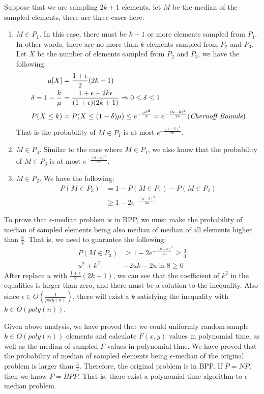 \documentclass[paper=a4, fontsize=11pt]{scrartcl} %
\numberwithin{equation}{section} %
\numberwithin{figure}{section} %
\numberwithin{table}{section} %
\begin{document}
Suppose that we are sampling $2k+1$ elements, let $M$ be the median of the sampled elements, there
are three cases here:
\begin{enumerate}
  \item $M \in P_1$. In this case, there must be $k+1$ or more elements sampled from $P_1$. In other
    words, there are no more than $k$ elements sampled from $P_2$ and $P_3$. Let $X$ be the number of
    elements sampled from $P_2$ and $P_3$, we have the following:
    \begin{align}
      \mu[X] & = \frac{1 + \epsilon}{2} (2k+1) \\
      \delta = 1 - \frac{k}{\mu} &= \frac{1 + \epsilon + 2k\epsilon}{(1+\epsilon)(2k+1)} \Rightarrow 
      0 \leq \delta \leq 1\\
      P(X \leq k) &= P(X \leq (1 - \delta) \mu) \leq e^{-\frac{\mu \delta^2}{2}} 
      = e^{-\frac{(u-k)^2}{2u}} (\text{\textit{Chernoff Bounds}}) 
    \end{align}
    That is the probability of $M \in P_1$ is at most $e^{-\frac{(u-k)^2}{2u}}$. 
  \item $M \in P_3$. Similar to the case where $M \in P_1$, we also know that the probability of $M
    \in P_3$ is at most $e^{-\frac{(u-k)^2}{2u}}$. 
  \item $M \in P_2$. We have the following:
    \begin{align}
    P(M \in P_3) &= 1 - P(M \in P_1) - P(M \in P_2) \\
    &\geq 1 - 2 e^{-\frac{(u-k)^2}{2u}}
    \end{align}
\end{enumerate}

To prove that $\epsilon$-median problem is in BPP, we must make the probability of median of sampled
elements being also median of median of all elements higher than $\frac{3}{4}$. That is, we need to
guarantee the following:
\begin{align}
   P(M \in P_3) &\geq 1 - 2 e^{-\frac{(u-k)^2}{2u}} \geq \frac{3}{4} \\
   u^2 + k^2 & -2uk -2u\ln 8 \geq 0  
\end{align}
After replace $u$ with $\frac{1 + \epsilon}{2} (2k+1)$, we can see that the coefficient of $k^2$ in 
the equalities is larger than zero, and there must be a solution to the inequality. Also since
$\epsilon \in O(\frac{1}{poly(n)})$, there will exist a $k$ satisfying the inequality with $k \in
O(poly(n))$.

Given above analysis, we have proved that we could uniformly random sample $k \in O(poly(n))$
elements and calculate $F(x, y)$ values in polynomial time, as well as the median of sampled $F$
values in polynomial time. We have proved that the probability of median of sampled elements 
being $\epsilon$-median of the original problem is larger than $\frac{3}{4}$. Therefore, the
original problem is in BPP. If $P = NP$, then we know $P = BPP$. That is, there exist a polynomial
time algorithm to $\epsilon$-median problem.
\end{document}

